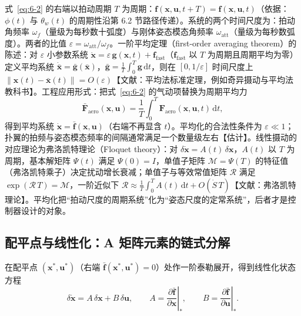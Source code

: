 \documentclass[11pt,a4paper]{ctexart}
\numberwithin{equation}{section}
\begin{document}
式~\eqref{eq:6-2} 的右端以拍动周期 $T$ 为周期：$\bm{f}(\bm{x}, \bm{u}, t + T) = \bm{f}(\bm{x}, \bm{u}, t)$（依据：$\phi(t)$ 与 $\theta_w(t)$ 的周期性沿第 6.2 节路径传递）。系统的两个时间尺度为：拍动角频率 $\omega_f$（量级为每秒数十弧度）与刚体姿态模态角频率 $\omega_{\text{att}}$（量级为每秒数弧度）。两者的比值 $\varepsilon = \omega_{\text{att}}/\omega_f$。一阶平均定理（first-order averaging theorem）的陈述：对 $\varepsilon$ 小参数系统 $\dot{\bm{x}} = \varepsilon\,\bm{g}(\bm{x}, t) + \bm{f}_{\text{fast}}$（$\bm{f}_{\text{fast}}$ 以 $T$ 为周期且周期平均为零）定义平均系统 $\dot{\bar{\bm{x}}} = \bar{\bm{g}}(\bar{\bm{x}})$，$\bar{\bm{g}} = \tfrac{1}{T}\int_0^T \bm{g}\,\mathrm{d}t$，则在 $[0, 1/\varepsilon]$ 时间尺度上 $\|\bm{x}(t) - \bar{\bm{x}}(t)\| = O(\varepsilon)$【文献：平均法标准定理，例如奇异摄动与平均法教科书】。工程应用形式：把式~\eqref{eq:6-2} 的气动项替换为周期平均力
\begin{equation}
  \bar{\bm{F}}_{\text{aero}}(\bm{x}, \bm{u}) = \frac{1}{T}\int_0^T \bm{F}_{\text{aero}}(\bm{x}, \bm{u}, t)\,\mathrm{d}t, \label{eq:6-3}
\end{equation}
得到平均系统 $\dot{\bm{x}} = \bar{\bm{f}}(\bm{x}, \bm{u})$（右端不再显含 $t$）。平均化的合法性条件为 $\varepsilon \ll 1$；扑翼的拍频与姿态模态频率的间隔通常满足一个数量级左右【估计】。线性摄动的对应理论为弗洛凯特理论（Floquet theory）：对 $\delta\dot{\bm{x}} = A(t)\,\delta\bm{x}$，$A(t)$ 以 $T$ 为周期，基本解矩阵 $\Psi(t)$ 满足 $\Psi(0) = I$，单值子矩阵 $\mathcal{M} = \Psi(T)$ 的特征值（弗洛凯特乘子）决定扰动增长衰减；单值子与等效常值矩阵 $\mathcal{R}$ 满足 $\exp(\mathcal{R}\, T) = \mathcal{M}$，一阶近似下 $\mathcal{R} \approx \tfrac{1}{T}\int_0^T A(t)\,\mathrm{d}t + O(\dot{S}\, T)$【文献：弗洛凯特理论】。平均化把“拍动尺度的周期系统”化为“姿态尺度的定常系统”，后者才是控制器设计的对象。

\subsection{配平点与线性化：A 矩阵元素的链式分解}

在配平点 $(\bm{x}^*, \bm{u}^*)$（右端 $\bar{\bm{f}}(\bm{x}^*, \bm{u}^*) = 0$）处作一阶泰勒展开，得到线性化状态方程
\begin{equation}
  \delta\dot{\bm{x}} = A\,\delta\bm{x} + B\,\delta\bm{u}, \qquad
  A = \left.\frac{\partial\bar{\bm{f}}}{\partial\bm{x}}\right|_{*}, \qquad
  B = \left.\frac{\partial\bar{\bm{f}}}{\partial\bm{u}}\right|_{*}. \label{eq:6-4}
\end{equation}
\end{document}
